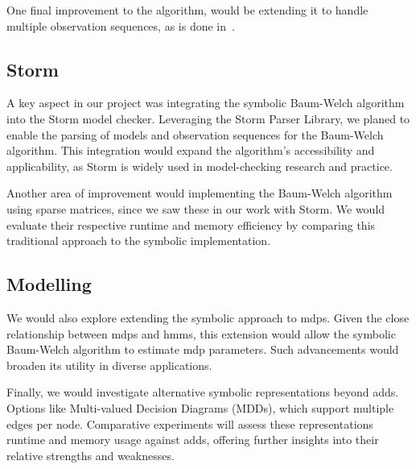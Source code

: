 One final improvement to the algorithm, would be extending it to handle multiple observation sequences, as is done in~\cite{reynouard2023jajapy}.

\subsection{Storm}
A key aspect in our project was integrating the symbolic Baum-Welch algorithm into the Storm model checker. 
Leveraging the Storm Parser Library, we planed to enable the parsing of models and observation sequences for the Baum-Welch algorithm.
This integration would expand the algorithm's accessibility and applicability, as Storm is widely used in model-checking research and practice.

Another area of improvement would implementing the Baum-Welch algorithm using sparse matrices, since we saw these in our work with Storm. 
We would evaluate their respective runtime and memory efficiency by comparing this traditional approach to the symbolic implementation. 

\subsection{Modelling}
We would also explore extending the symbolic approach to \glspl{mdp}. 
Given the close relationship between \glspl{mdp} and \glspl{hmm}, this extension would allow the symbolic Baum-Welch algorithm to estimate \gls{mdp} parameters. 
Such advancements would broaden its utility in diverse applications.

Finally, we would investigate alternative symbolic representations beyond \glspl{add}. 
Options like Multi-valued Decision Diagrams (MDDs), which support multiple edges per node.
Comparative experiments will assess these representations runtime and memory usage against \glspl{add}, offering further insights into their relative strengths and weaknesses.